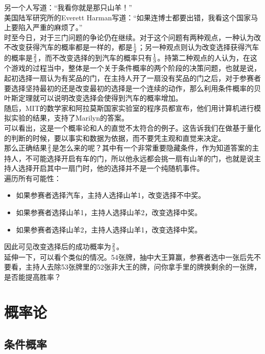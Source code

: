 另一个人写道：“我看你就是那只山羊！”\\

美国陆军研究所的Everett Harman写道：“如果连博士都要出错，我看这个国家马上要陷入严重的麻烦了。”\\

时至今日，对于三门问题的争论仍在继续。对于这个问题有两种观点，一种认为改不改变获得汽车的概率都是一样的，都是$ 1 \over 2 $；另一种观点则认为改变选择获得汽车的概率是$ 2 \over 3 $，而不改变选择的到汽车的概率只有$ 1 \over 3 $。持第二种观点的人认为，在这个游戏的过程当中，整体是一个关于条件概率的两个阶段的决策问题，也就是说，起初选择一扇认为有奖品的门，在主持人开了一扇没有奖品的门之后，对于参赛者要选择坚持最初的还是改变最初的选择是一个连续的动作，那么利用条件概率的贝叶斯定理就可以说明改变选择会使得到汽车的概率增加。\\

随后，MIT的数学家和阿拉莫斯国家实验室的程序员都宣布，他们用计算机进行模拟实验的结果，支持了Marilyn的答案。\\

可以看出，这是一个概率论和人的直觉不太符合的例子。这告诉我们在做基于量化的判断的时候，要以事实和数据为依据，而不要凭主观和直觉来决定。\\

那么正确结果$ 2 \over 3 $是怎么来的呢？其中有一个非常重要隐藏条件，作为知道答案的主持人，不可能选择开启有车的门，所以他永远都会挑一扇有山羊的门，也就是说主持人选择开启其中一扇门时，他的选择并不是一个纯随机事件。\\

遍历所有可能性：

\begin{itemize}
	\item 如果参赛者选择汽车，主持人选择山羊1，改变选择不中奖。
	\item 如果参赛者选择山羊1，主持人选择山羊2，改变选择中奖。
	\item 如果参赛者选择山羊2，主持人选择山羊1，改变选择中奖。
\end{itemize}

因此可见改变选择后的成功概率为$ 2 \over 3 $。\\

延伸一下，可以看个类似的情况。54张牌，抽中大王算赢，参赛者选中一张后先不要看，主持人去除53张牌里的52张非大王的牌，问你拿手里的牌换剩余的一张牌，是否能提高胜率？

\newpage

\section{概率论}

\subsection{条件概率}

